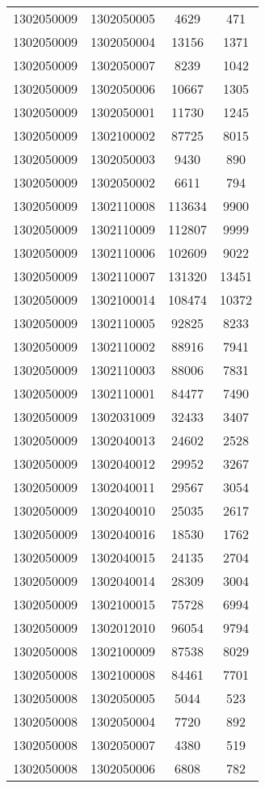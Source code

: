\begin{longtable}{llcc}
1302050009 & 1302050005 & 4629 & 471\\
1302050009 & 1302050004 & 13156 & 1371\\
1302050009 & 1302050007 & 8239 & 1042\\
1302050009 & 1302050006 & 10667 & 1305\\
1302050009 & 1302050001 & 11730 & 1245\\
1302050009 & 1302100002 & 87725 & 8015\\
1302050009 & 1302050003 & 9430 & 890\\
1302050009 & 1302050002 & 6611 & 794\\
1302050009 & 1302110008 & 113634 & 9900\\
1302050009 & 1302110009 & 112807 & 9999\\
1302050009 & 1302110006 & 102609 & 9022\\
1302050009 & 1302110007 & 131320 & 13451\\
1302050009 & 1302100014 & 108474 & 10372\\
1302050009 & 1302110005 & 92825 & 8233\\
1302050009 & 1302110002 & 88916 & 7941\\
1302050009 & 1302110003 & 88006 & 7831\\
1302050009 & 1302110001 & 84477 & 7490\\
1302050009 & 1302031009 & 32433 & 3407\\
1302050009 & 1302040013 & 24602 & 2528\\
1302050009 & 1302040012 & 29952 & 3267\\
1302050009 & 1302040011 & 29567 & 3054\\
1302050009 & 1302040010 & 25035 & 2617\\
1302050009 & 1302040016 & 18530 & 1762\\
1302050009 & 1302040015 & 24135 & 2704\\
1302050009 & 1302040014 & 28309 & 3004\\
1302050009 & 1302100015 & 75728 & 6994\\
1302050009 & 1302012010 & 96054 & 9794\\
1302050008 & 1302100009 & 87538 & 8029\\
1302050008 & 1302100008 & 84461 & 7701\\
1302050008 & 1302050005 & 5044 & 523\\
1302050008 & 1302050004 & 7720 & 892\\
1302050008 & 1302050007 & 4380 & 519\\
1302050008 & 1302050006 & 6808 & 782\\

\end{longtable}

